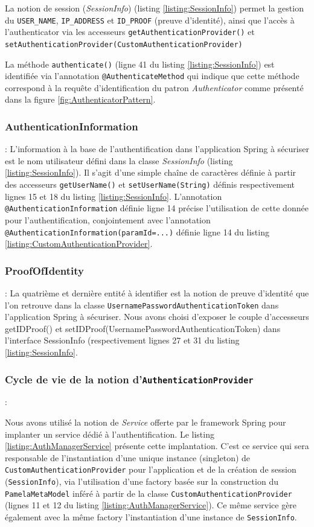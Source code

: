 La notion de session (\textit{SessionInfo}) (listing \ref{listing:SessionInfo}) permet la gestion du \texttt{USER\_NAME}, \texttt{IP\_ADDRESS} et \texttt{ID\_PROOF} (preuve d'identité), ainsi que l'accès à l'authenticator via les accesseurs \texttt{getAuthenticationProvider()} et \texttt{setAuthenticationProvider(CustomAuthenticationProvider)}

La méthode \texttt{authenticate()} (ligne 41 du listing \ref{listing:SessionInfo}) est identifiée via l'annotation \texttt{@AuthenticateMethod} qui indique que cette méthode correspond à la requête d'identification du patron \textit{Authenticator} comme présenté dans la figure \ref{fig:AuthenticatorPattern}.

\subsubsection{AuthenticationInformation} : L'information à la base de l'authentification dans l'application Spring à sécuriser est le nom utilisateur défini dans la classe \textit{SessionInfo} (listing \ref{listing:SessionInfo}). Il s'agit d'une simple chaîne de caractères définie à partir des accesseurs \texttt{getUserName()} et \texttt{setUserName(String)} définis respectivement lignes 15 et 18 du listing  \ref{listing:SessionInfo}. L'annotation \texttt{@AuthenticationInformation} définie ligne 14 précise l'utilisation de cette donnée pour l'authentification, conjointement avec l'annotation \texttt{@AuthenticationInformation(paramId=...)} définie ligne 14 du listing \ref{listing:CustomAuthenticationProvider}.

\subsubsection{ProofOfIdentity} : La quatrième et dernière entité à identifier est la notion de preuve d'identité que l'on retrouve dans la classe \texttt{UsernamePasswordAuthenticationToken} dans l'application Spring à sécuriser. Nous avons choisi d'exposer le couple d'accesseurs getIDProof() et setIDProof(UsernamePasswordAuthenticationToken) dans l'interface SessionInfo (respectivement lignes 27 et 31 du listing \ref{listing:SessionInfo}.

\subsubsection{Cycle de vie de la notion d'\texttt{AuthenticationProvider}} :

Nous avons utilisé la notion de \textit{Service} offerte par le framework Spring pour implanter un service dédié à l'authentification. Le listing \ref{listing:AuthManagerService} présente cette implantation. C'est ce service qui sera responsable de l'instantiation d'une unique instance (singleton) de \texttt{CustomAuthenticationProvider} pour l'application et de la création de session (\texttt{SessionInfo}), via l'utilisation d'une factory basée sur la construction du \texttt{PamelaMetaModel} inféré à partir de la classe \texttt{CustomAuthenticationProvider} (lignes 11 et 12 du listing \ref{listing:AuthManagerService}). Ce même service gère également avec la même factory l'instantiation d'une instance de \texttt{SessionInfo}.

